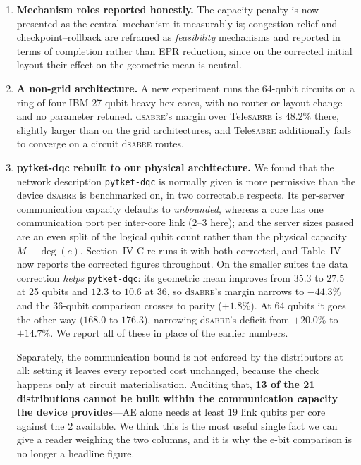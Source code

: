 \documentclass[11pt]{article}
\newcommand{\dSABRE}{d\textsc{sabre}}
\newcommand{\TeleSABRE}{Tele\textsc{sabre}}
\begin{document}
\begin{enumerate}[leftmargin=*]
\item \textbf{Mechanism roles reported honestly.}  The capacity penalty
is now presented as the central mechanism it measurably is; congestion
relief and checkpoint--rollback are reframed as \emph{feasibility}
mechanisms and reported in terms of completion rather than EPR
reduction, since on the corrected initial layout their effect on the
geometric mean is neutral.

\item \textbf{A non-grid architecture.}  A new experiment runs the
64-qubit circuits on a ring of four IBM 27-qubit heavy-hex cores, with
no router or layout change and no parameter retuned.  \dSABRE{}'s
margin over \TeleSABRE{} is $48.2\%$ there, slightly larger than on the
grid architectures, and \TeleSABRE{} additionally fails to converge on
a circuit \dSABRE{} routes.

\item \textbf{pytket-dqc rebuilt to our physical architecture.}  We
found that the network description \texttt{pytket-dqc} is normally
given is more permissive than the device \dSABRE{} is benchmarked on,
in two correctable respects.  Its per-server communication capacity
defaults to \emph{unbounded}, whereas a core has one communication port
per inter-core link ($2$--$3$ here); and the server sizes passed are an
even split of the logical qubit count rather than the physical capacity
$M-\deg(c)$.  Section~IV-C re-runs it with both corrected, and Table~IV now reports
the corrected figures throughout.  On the smaller suites the data
correction \emph{helps} \texttt{pytket-dqc}: its geometric mean improves
from $35.3$ to $27.5$ at 25 qubits and $12.3$ to $10.6$ at 36, so
\dSABRE{}'s margin narrows to $-44.3\%$ and the 36-qubit comparison
crosses to parity ($+1.8\%$).  At 64 qubits it goes the other way
($168.0$ to $176.3$), narrowing \dSABRE{}'s deficit from $+20.0\%$ to
$+14.7\%$.  We report all of these in place of the earlier numbers.

Separately, the communication bound is not enforced by the distributors
at all: setting it leaves every reported cost unchanged, because the
check happens only at circuit materialisation.  Auditing that,
\textbf{13 of the 21 distributions cannot be built within the
communication capacity the device provides}---AE alone needs at least
$19$ link qubits per core against the $2$ available.  We think this is
the most useful single fact we can give a reader weighing the two
columns, and it is why the e-bit comparison is no longer a headline
figure.


\end{enumerate}
\end{document}
